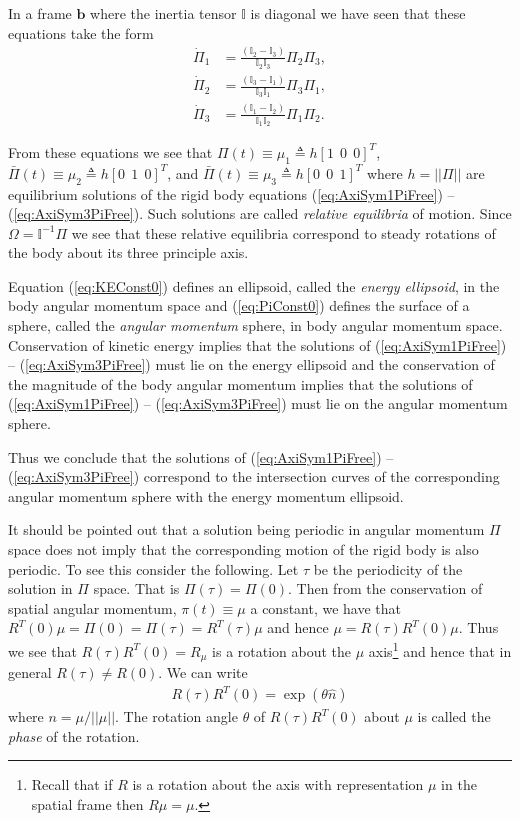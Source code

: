 \documentclass[graybox,envcountchap,sectrefs]{svmonoMuga}
\begin{document}
In a frame $\mathbf{b}$ where the inertia tensor $\mathbb{I}$ is diagonal we have seen that these equations take the form
\begin{align}
\dot{\Pi}_1 & =  \frac{(\mathbb{I}_2-\mathbb{I}_3)}{\mathbb{I}_2 \mathbb{I}_3}\Pi_2 \Pi_3, \label{eq:AxiSym1PiFree}\\
\dot{\Pi}_2 & =  \frac{(\mathbb{I}_3-\mathbb{I}_1)}{\mathbb{I}_3 \mathbb{I}_1}\Pi_3 \Pi_1, \label{eq:AxiSym2PiFree}\\
\dot{\Pi}_3 & =  \frac{(\mathbb{I}_1-\mathbb{I}_2)}{\mathbb{I}_1 \mathbb{I}_2}\Pi_1 \Pi_2. \label{eq:AxiSym3PiFree}
\end{align}
\begin{svgraybox}
From these equations we see that ${\Pi}(t)\equiv \mu_1\triangleq h [1\:\:0\:\:0]^T$, $\bar{\Pi}(t)\equiv \mu_2\triangleq h [0\:\:1\:\:0]^T$, and $\bar{\Pi}(t)\equiv \mu_3\triangleq h [0\:\:0\:\:1]^T$ where $h=||\Pi||$ are equilibrium solutions of the rigid body equations (\ref{eq:AxiSym1PiFree}) -- (\ref{eq:AxiSym3PiFree}). Such solutions are called \emph{relative equilibria} of motion. Since $\Omega=\mathbb{I}^{-1}\Pi$ we see that these relative equilibria correspond to steady rotations of the body about its three principle axis.
\end{svgraybox}


Equation (\ref{eq:KEConst0}) defines an ellipsoid, called the \emph{energy ellipsoid}, in the body angular momentum space and (\ref{eq:PiConst0}) defines the surface of a sphere, called the \emph{angular momentum} sphere, in body angular momentum space. 
Conservation of kinetic energy implies that the solutions of (\ref{eq:AxiSym1PiFree}) -- (\ref{eq:AxiSym3PiFree}) must lie on the energy ellipsoid and the conservation of the magnitude of the body angular momentum implies that the solutions of (\ref{eq:AxiSym1PiFree}) -- (\ref{eq:AxiSym3PiFree}) must lie on the angular momentum sphere. 
\begin{svgraybox}
Thus we conclude that the solutions of (\ref{eq:AxiSym1PiFree}) -- (\ref{eq:AxiSym3PiFree}) correspond to the intersection curves of the corresponding angular momentum sphere with the energy momentum ellipsoid.  
\end{svgraybox}
It should be pointed out that a solution being periodic in angular momentum $\Pi$ space does not imply that the corresponding motion of the rigid body is also periodic. To see this 
consider the following.
Let $\tau$ be the periodicity of the solution in $\Pi$ space. That is $\Pi(\tau)=\Pi(0)$. Then from the conservation of spatial angular momentum, $\pi(t)\equiv \mu$ a constant, we have that $R^T(0)\mu=\Pi(0)=
\Pi(\tau)=R^T(\tau)\mu$ and hence $\mu=R(\tau)R^T(0)\mu$. Thus we see that $R(\tau)R^T(0)=R_{\mu}$ is a rotation about the $\mu$ axis\footnote{Recall that if $R$ 
is a rotation about the axis with representation $\mu$ in the spatial frame then $R\mu=\mu$.} and hence that in general $R(\tau)\neq R(0)$. We can write
\begin{align}
R(\tau)R^T(0)=\exp{\left(\theta\widehat{n}\right)}
\end{align}
where $n=\mu/||\mu||$. The rotation angle $\theta$ of $R(\tau)R^T(0)$ about $\mu$ is called the \emph{phase} of the rotation.
\end{document}
